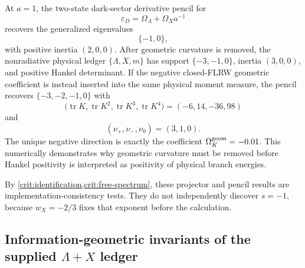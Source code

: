 \documentclass[aps,prd,reprint,onecolumn,nofootinbib,superscriptaddress,showkeys]{revtex4-2}
\numberwithin{equation}{section}
\theoremstyle{definition}
\theoremstyle{plain}
\begin{document}
At \(a=1\), the two-state dark-sector derivative pencil for
\begin{equation}
\varepsilon_D=\Omega_\Lambda+\Omega_Xa^{-1}
\end{equation}
recovers the generalized eigenvalues
\begin{equation}
\boxed{\{-1,0\}},
\end{equation}
with positive inertia \((2,0,0)\).  After geometric curvature is removed, the nonradiative physical ledger \(\{\Lambda,X,m\}\) has support \(\{-3,-1,0\}\), inertia \((3,0,0)\), and positive Hankel determinant.  If the negative closed-FLRW geometric coefficient is instead inserted into the same physical moment measure, the pencil recovers \(\{-3,-2,-1,0\}\) with
\begin{equation}
\bigl(\operatorname{tr}K,\operatorname{tr}K^2,
\operatorname{tr}K^3,\operatorname{tr}K^4\bigr)
=(-6,14,-36,98)
\end{equation}
and
\begin{equation}
\boxed{(\nu_+,\nu_-,\nu_0)=(3,1,0)}.
\end{equation}
The unique negative direction is exactly the coefficient \(\Omega_K^{\rm geom}=-0.01\).  This numerically demonstrates why geometric curvature must be removed before Hankel positivity is interpreted as positivity of physical branch energies.

By \cref{crit:identification,crit:free-spectrum}, these projector and pencil results are implementation-consistency tests.  They do not independently discover \(s=-1\), because \(w_X=-2/3\) fixes that exponent before the calculation.

\subsection{Information-geometric invariants of the supplied \texorpdfstring{$\Lambda+X$}{Lambda+X} ledger}
\end{document}
